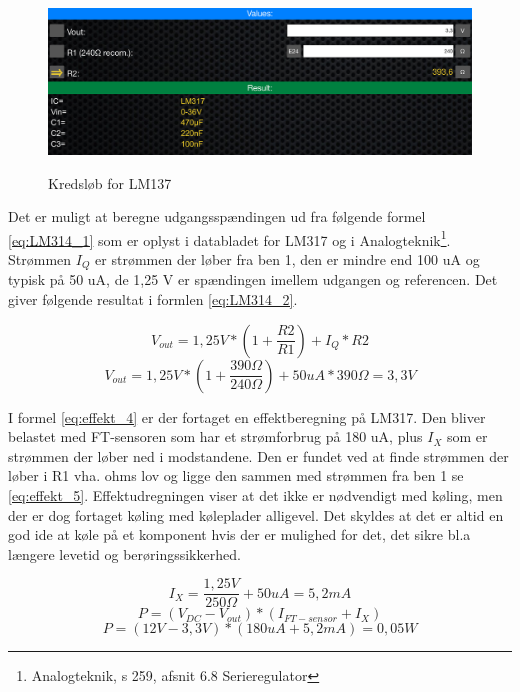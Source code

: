 \begin{figure}[H] \centering
{\includegraphics[width=\textwidth]{filer/design/Billeder/LM317_calc}}
\caption{Kredsløb for LM137}
\label{lab:LM317_calc}
\raggedright
\end{figure}

Det er muligt at beregne udgangsspændingen ud fra følgende formel \ref{eq:LM314_1} som er oplyst i databladet for LM317 og i Analogteknik\footnote{Analogteknik, s 259, afsnit 6.8 Serieregulator}. Strømmen $I_Q$ er strømmen der løber fra ben 1, den er mindre end 100 uA og typisk på 50 uA, de 1,25 V er spændingen imellem udgangen og referencen. Det giver følgende resultat i formlen \ref{eq:LM314_2}. 

\begin{equation} 
V_{out} = 1,25 V*(1+\frac{R2}{R1})+I_Q*R2
\label{eq:LM314_1}
\end{equation}
\begin{equation} 
V_{out} = 1,25 V*(1+\frac{390\Omega}{240\Omega})+50uA*390\Omega = 3,3 V
\label{eq:LM314_2}
\end{equation}


I formel \ref{eq:effekt_4} er der fortaget en effektberegning på LM317. Den bliver belastet med FT-sensoren som har et strømforbrug på 180 uA, plus $I_X$ som er strømmen der løber ned i modstandene. Den er fundet ved at finde strømmen der løber i R1 vha. ohms lov og ligge den sammen med strømmen fra ben 1 se \ref{eq:effekt_5}. Effektudregningen viser at det ikke er nødvendigt med køling, men der er dog  fortaget køling med køleplader alligevel. Det skyldes at det er altid en god ide at køle på et komponent hvis der er mulighed for det, det sikre bl.a længere levetid og berøringssikkerhed.

\begin{equation} 
I_X = \frac{1,25V}{250\Omega}+50uA = 5,2 mA  
\label{eq:effekt_5}
\end{equation} 
\begin{equation} 
P = (V_{DC}-V_{out})*(I_{FT-sensor}+I_X) 
\label{eq:effekt_3}
\end{equation}
\begin{equation} 
P = (12V - 3,3V)*(180 uA +5,2 mA)= 0,05 W 
\label{eq:effekt_4}
\end{equation}


